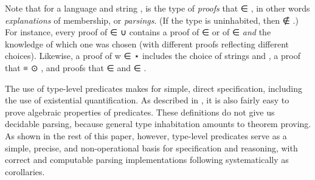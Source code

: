 \documentclass[acmsmall,screen,timestamp,anonymous,review]{acmart}
\begin{document}
Note that for a language  and string , { } is the type of \emph{proofs} that { \AF ∈ }, in other words \emph{explanations} of membership, or \emph{parsings}.
(If the type { } is uninhabited, then { ∉ }.)
For instance, every proof of { \AF ∈  \AF ∪ } contains a proof of { \AF ∈ } or of { \AF ∈ } \emph{and} the knowledge of which one was chosen (with different proofs reflecting different choices).
Likewise, a proof of {w \AF ∈  \AF ⋆ } includes the choice of strings  and , a proof that { \AD ≡  \AF ⊙ }, and proofs that { \AF ∈ } and { \AF ∈ }.

The use of type-level predicates makes for simple, direct specification, including the use of existential quantification.
As described in , it is also fairly easy to prove algebraic properties of predicates.
These definitions do not give us decidable parsing, because general type inhabitation amounts to theorem proving.
As shown in the rest of this paper, however, type-level predicates serve as a simple, precise, and non-operational basis for specification and reasoning, with correct and computable parsing implementations following systematically as corollaries.
\end{document}

